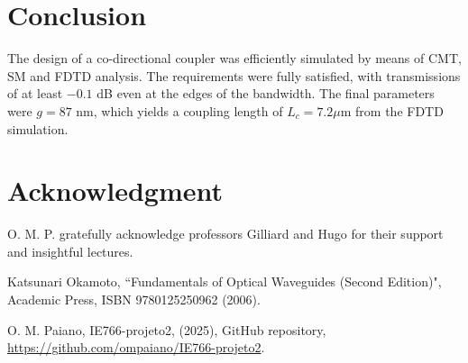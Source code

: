 \documentclass[conference]{IEEEtran}
\begin{document}
\section{Conclusion}
The design of a co-directional coupler was efficiently simulated by means of CMT, SM and FDTD analysis. The requirements were fully satisfied, with transmissions of at least $-0.1$ dB even at the edges of the bandwidth. The final parameters were $g=87$ nm, which yields a coupling length of $L_c = 7.2 \mu\text{m}$ from the FDTD simulation.

\section*{Acknowledgment}
O. M. P. gratefully acknowledge professors Gilliard and Hugo for their support and insightful lectures. 

\begin{thebibliography}{00}
 Katsunari Okamoto, ``Fundamentals of Optical Waveguides (Second Edition)", Academic Press, ISBN 9780125250962 (2006).

 O. M. Paiano, IE766-projeto2, (2025), GitHub repository, \url{https://github.com/ompaiano/IE766-projeto2}.

\end{thebibliography}
\vspace{12pt}
\end{document}
